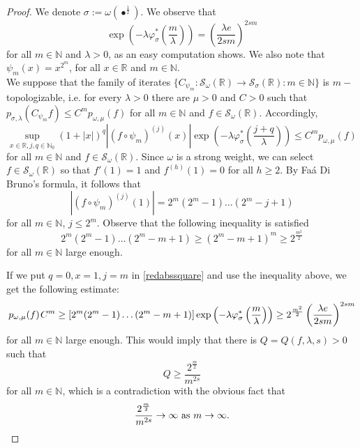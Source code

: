 \documentclass[12pt,reqno]{amsart} %
\numberwithin{equation}{section}
\begin{document}
\begin{proof}
We denote $\sigma:=\omega(\bullet^{\frac{1}{2}})$. We observe that 
\begin{equation*}
	\exp\left(-\lambda \varphi^*_\sigma\left(\frac{m}{\lambda}\right)\right)=\left(\frac{\lambda e}{2s m}\right)^{2s m}
\end{equation*} 
for all $m\in\mathbb{N}$ and $\lambda>0$, as  an easy computation shows.
We also  note that $\psi_m(x)=x^{2^m}$, for all $x\in\mathbb{R}$ and $m\in\mathbb{N}$.\\

We  suppose that the family of iterates $\{C_{\psi_m}:\mathcal{S}_{\omega}(\mathbb{R})\to \mathcal{S}_{\sigma}(\mathbb{R}):m\in\mathbb{N}\}$ is $m-$topologizable, i.e. for every $\lambda>0$ there are $\mu>0$ and $C>0$ such that $p_{\sigma,\lambda}(C_{\psi_m}f)\leq C^mp_{\omega,\mu}(f)$ for all $m\in\mathbb{N}$ and  $f\in \mathcal{S}_{\omega}(\mathbb{R})$. Accordingly, 
\begin{equation}\label{redabssquare}
	\sup_{x\in\mathbb{R}, j, q\in\mathbb{N}_0} (1+|x|)^q  |(f\circ \psi_m)^{(j)}(x)|  \exp\left(-\lambda \varphi^*_\sigma\left(\frac{j+q}{\lambda}\right)\right) \leq C^m  p_{\omega,\mu}(f)
\end{equation} 
for all $m\in\mathbb{N}$ and  $f\in \mathcal{S}_{\omega}(\mathbb{R})$. Since $\omega$ is a strong weight, we can select $f\in \mathcal{S}_{\omega}(\mathbb{R})$ so that $f'(1)=1$ and $f^{(h)}(1)=0$ for all $h\geq 2$. 
By Fa\'a Di Bruno's formula, it follows that 
\begin{equation*}
	|(f\circ\psi_m)^{(j)}(1)|=2^m (2^m-1) \ldots (2^m-j+1)
\end{equation*} 
for all $m\in\mathbb{N}$, $j\leq 2^m$. Observe that  the following inequality is satisfied 
\begin{equation*}
	2^m (2^m-1) \ldots (2^m-m+1)\geq (2^m-m+1)^m \geq 2^{\frac{m^2}{2}}
\end{equation*} 
for all $m\in\mathbb{N}$ large enough.

If we put $q=0,x=1,j=m$ in \eqref{redabssquare} and use the  inequality above, we get the following estimate: \begin{equation*}
	p_{\omega,\mu}(f)\hspace{0.03cm} C^m \geq  [2^m(2^m-1) \ldots (2^m-m+1)]\exp\left(-\lambda \varphi^*_\sigma\left(\frac{m}{\lambda}\right)\right) \geq 2^{\frac{m^2}{2}} \left(\frac{\lambda e}{2s m}\right)^{2s m}
\end{equation*}
for all $m\in\mathbb{N}$ large enough.  This would imply that there is $Q=Q(f,\lambda, s)>0$ such that 
\begin{equation*}
	Q\geq \frac{2^{\frac{m}{2}}}{m^{2s}}
\end{equation*}
for all $m\in\mathbb{N}$, which is a contradiction with the obvious fact that
\begin{equation*}
	\frac{2^{\frac{m}{2}}}{m^{2s}}\to \infty \mbox{ as } m\to \infty.\qedhere
\end{equation*} 
\end{proof}
\end{document}
